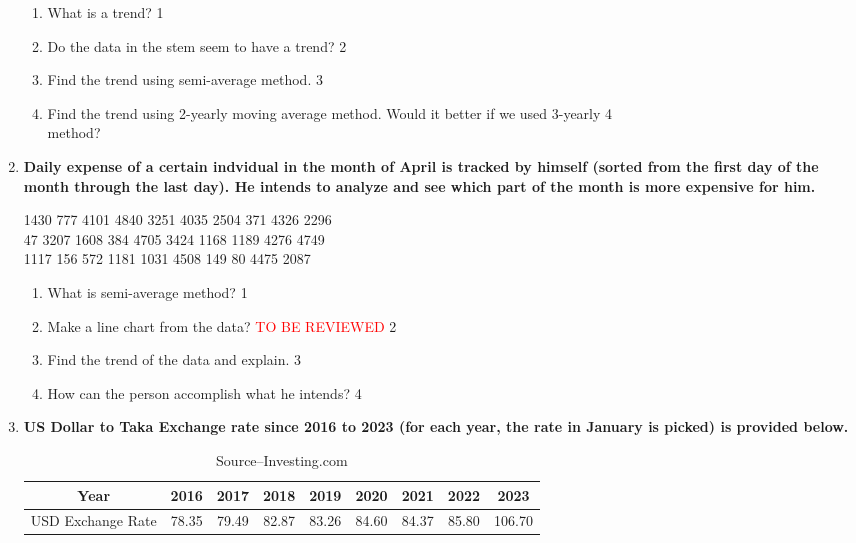 \documentclass[a4paper,oneside]{book}
\begin{document}
\begin{enumerate}
  \begin{enumerate}
    \item
	What is a trend? \hfill 1
    \item
	Do the data in the stem seem to have a trend? \hfill 2
    \item  
	Find the trend using semi-average method. \hfill 3
    \item
	Find the trend using 2-yearly moving average method. Would it better if we used 3-yearly  \hfill 4 \\  method?
\end{enumerate}

 \item
	  \textbf{Daily expense of a certain indvidual in the month of April is tracked by himself (sorted from the first day of the month through the last day). He intends to analyze and see which part of the month is more expensive for him.}
	  
	  \begin{center}
1430  777 4101 4840 3251 4035 2504  371 4326 2296 \\
47 3207 1608  384 4705 3424 1168 1189 4276 4749 \\
1117  156  572 1181 1031 4508  149   80 4475 2087
\end{center}
  
  \begin{enumerate}
    \item
	What is semi-average method? \hfill 1
    \item
	Make a line chart from the data? \textcolor{red}{TO BE REVIEWED} \hfill 2
    \item  
	Find the trend of the data and explain. \hfill 3
    \item
	How can the person accomplish what he intends? \hfill 4
  \end{enumerate}
  
  \item
	  \textbf{US Dollar to Taka Exchange rate since 2016 to 2023 (for each year, the rate in January is picked) is provided below. } 
  
  \begin{table}[h]
  \centering
\begin{tabular}{c|c|c|c|c|c|c|c|c}
Year & 2016 & 2017 & 2018 & 2019 & 2020 & 2021 & 2022 & 2023 \\ \hline
USD Exchange Rate & 78.35 & 79.49 & 82.87 & 83.26 & 84.60 & 84.37 & 85.80 & 106.70
\end{tabular}
\caption{\label{usdrate}Source--Investing.com}
\end{table}
  

\end{enumerate}
\end{document}
